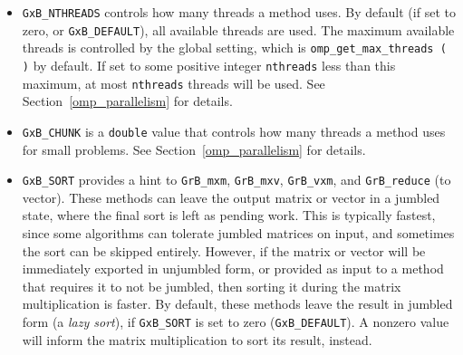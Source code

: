 \documentclass[12pt]{article}
\begin{document}
{\begin{itemize}
\begin{itemize}
\item \verb'GxB_AxB_DOT': computes \verb"C(i,j)=A(i,:)*B(j,:)'", for each
    entry \verb'C(i,j)'.  If the mask is present and not complemented, only
    entries for which \verb'M(i,j)=1' are computed.  This is a very specialized
    method that works well only if the mask is present, very sparse, and not
    complemented, when \verb'C' is small, or when \verb'C' is bitmap or full.
    For example, it works very well
    when \verb'A' and \verb'B' are tall and thin, and \verb"C<M>=A*B'" or
    \verb"C=A*B'" are computed.  These expressions assume all matrices are in
    CSR format.  If in CSC format, then the dot-product method used for
    \verb"A'*B".  The method is impossibly slow if \verb'C' is large and the
    mask is not present, since it takes $\Omega(mn)$ time if \verb'C' is
    $m$-by-$n$ in that case.  It does not use any workspace at all.  Since it
    uses no workspace, it can work very well for extremely sparse or
    hypersparse matrices, when the mask is present and not complemented.

    \end{itemize}

\item \verb'GxB_NTHREADS' controls how many threads a method uses.
    By default (if set to zero, or \verb'GxB_DEFAULT'), all available threads
    are used.  The maximum available threads is controlled by the global
    setting, which is \verb'omp_get_max_threads ( )' by default.  If set to
    some positive integer \verb'nthreads' less than this maximum, at most
    \verb'nthreads' threads will be used.  See Section~\ref{omp_parallelism}
    for details.

\item \verb'GxB_CHUNK' is a \verb'double' value that controls how many threads
    a method uses for small problems.  See Section~\ref{omp_parallelism} for
    details.

\item \verb'GxB_SORT' provides a hint to \verb'GrB_mxm', \verb'GrB_mxv',
    \verb'GrB_vxm', and \verb'GrB_reduce' (to vector).  These methods can leave
    the output matrix or vector in a jumbled state, where the final sort is
    left as pending work.  This is typically fastest, since some algorithms can
    tolerate jumbled matrices on input, and sometimes the sort can be skipped
    entirely.  However, if the matrix or vector will be immediately exported in
    unjumbled form, or provided as input to a method that requires it to not be
    jumbled, then sorting it during the matrix multiplication is faster.
    By default, these methods leave the result in jumbled form (a {\em lazy
    sort}), if \verb'GxB_SORT' is set to zero (\verb'GxB_DEFAULT').  A nonzero
    value will inform the matrix multiplication to sort its result, instead.


\end{itemize}}
\end{document}
